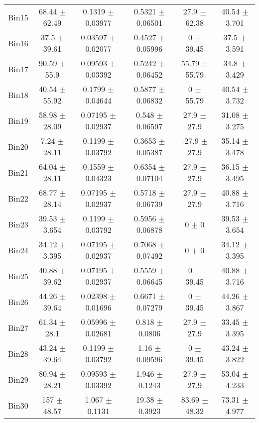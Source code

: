 \begin{tabular}{@{\extracolsep{4pt}}lccccc@{}}
     Bin15 & 68.44 $\pm$ 62.49 & 0.1319 $\pm$ 0.03977 & 0.5321 $\pm$ 0.06501 & 27.9 $\pm$ 62.38 & 40.54 $\pm$ 3.701 \\ 
     Bin16 & 37.5 $\pm$ 39.61 & 0.03597 $\pm$ 0.02077 & 0.4527 $\pm$ 0.05996 & 0 $\pm$ 39.45 & 37.5 $\pm$ 3.591 \\ 
     Bin17 & 90.59 $\pm$ 55.9 & 0.09593 $\pm$ 0.03392 & 0.5242 $\pm$ 0.06452 & 55.79 $\pm$ 55.79 & 34.8 $\pm$ 3.429 \\ 
     Bin18 & 40.54 $\pm$ 55.92 & 0.1799 $\pm$ 0.04644 & 0.5877 $\pm$ 0.06832 & 0 $\pm$ 55.79 & 40.54 $\pm$ 3.732 \\ 
     Bin19 & 58.98 $\pm$ 28.09 & 0.07195 $\pm$ 0.02937 & 0.548 $\pm$ 0.06597 & 27.9 $\pm$ 27.9 & 31.08 $\pm$ 3.275 \\ 
     Bin20 & 7.24 $\pm$ 28.11 & 0.1199 $\pm$ 0.03792 & 0.3653 $\pm$ 0.05387 & -27.9 $\pm$ 27.9 & 35.14 $\pm$ 3.478 \\ 
     Bin21 & 64.04 $\pm$ 28.11 & 0.1559 $\pm$ 0.04323 & 0.6354 $\pm$ 0.07104 & 27.9 $\pm$ 27.9 & 36.15 $\pm$ 3.495 \\ 
     Bin22 & 68.77 $\pm$ 28.14 & 0.07195 $\pm$ 0.02937 & 0.5718 $\pm$ 0.06739 & 27.9 $\pm$ 27.9 & 40.88 $\pm$ 3.716 \\ 
     Bin23 & 39.53 $\pm$ 3.654 & 0.1199 $\pm$ 0.03792 & 0.5956 $\pm$ 0.06878 & 0 $\pm$ 0 & 39.53 $\pm$ 3.654 \\ 
     Bin24 & 34.12 $\pm$ 3.395 & 0.07195 $\pm$ 0.02937 & 0.7068 $\pm$ 0.07492 & 0 $\pm$ 0 & 34.12 $\pm$ 3.395 \\ 
     Bin25 & 40.88 $\pm$ 39.62 & 0.07195 $\pm$ 0.02937 & 0.5559 $\pm$ 0.06645 & 0 $\pm$ 39.45 & 40.88 $\pm$ 3.716 \\ 
     Bin26 & 44.26 $\pm$ 39.64 & 0.02398 $\pm$ 0.01696 & 0.6671 $\pm$ 0.07279 & 0 $\pm$ 39.45 & 44.26 $\pm$ 3.867 \\ 
     Bin27 & 61.34 $\pm$ 28.1 & 0.05996 $\pm$ 0.02681 & 0.818 $\pm$ 0.0806 & 27.9 $\pm$ 27.9 & 33.45 $\pm$ 3.395 \\ 
     Bin28 & 43.24 $\pm$ 39.64 & 0.1199 $\pm$ 0.03792 & 1.16 $\pm$ 0.09596 & 0 $\pm$ 39.45 & 43.24 $\pm$ 3.822 \\ 
     Bin29 & 80.94 $\pm$ 28.21 & 0.09593 $\pm$ 0.03392 & 1.946 $\pm$ 0.1243 & 27.9 $\pm$ 27.9 & 53.04 $\pm$ 4.233 \\ 
     Bin30 & 157 $\pm$ 48.57 & 1.067 $\pm$ 0.1131 & 19.38 $\pm$ 0.3923 & 83.69 $\pm$ 48.32 & 73.31 $\pm$ 4.977 \\ 
\hline\hline
  \end{tabular}
